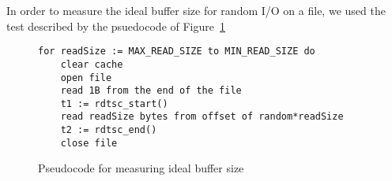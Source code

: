 In order to measure the ideal buffer size for random I/O on a file, we used the 
test described by the psuedocode of Figure~\ref{fig:p1code}

\begin{figure}[ht]
\begin{lstlisting}
for readSize := MAX_READ_SIZE to MIN_READ_SIZE do
	clear cache
	open file
	read 1B from the end of the file
	t1 := rdtsc_start()
	read readSize bytes from offset of random*readSize
	t2 := rdtsc_end()
	close file
\end{lstlisting} 
\caption{Pseudocode for measuring ideal buffer size}
\label{fig:p1code}
\end{figure}

